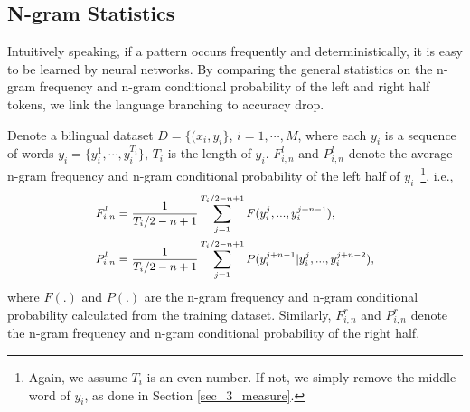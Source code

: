 \documentclass[11pt,a4paper]{article}
\begin{document}
\subsection{N-gram Statistics}
Intuitively speaking, if a pattern occurs frequently and deterministically, it is easy to be learned by neural networks. By comparing the general statistics on the n-gram frequency and n-gram conditional probability of the left and right half tokens, we link the language branching to accuracy drop.

Denote a bilingual dataset $D=\{(x_i,y_i\}$, $i=1,\cdots,M$, where each $y_i$ is a sequence of words $y_i=\{y_i^1,\cdots,y_i^{T_i}\}$, $T_i$ is the length of $y_i$. $F^{l}_{i,n}$ and $P^{l}_{i,n}$ denote the average n-gram frequency and n-gram conditional probability of the left half of $y_i$~\footnote{Again, we assume $T_i$ is an even number. If not, we simply remove the middle word of $y_i$, as done in Section \ref{sec_3_measure}.}, i.e.,
\begin{equation}
\small
\begin{aligned}
\label{eq_n_gram_freq}
F^{l}_{i,n}&=\frac{1}{T_i/2-n+1} \sum_{j=1}^{T_i/2-n+1} F(y_i^{j},...,y_i^{j+n-1}), \\
P^{l}_{i,n}&=\frac{1}{T_i/2-n+1} \sum_{j=1}^{T_i/2-n+1} P(y_i^{j+n-1} | y_i^{j},...,y_i^{j+n-2}),
\end{aligned}
\end{equation}
where $F(.)$ and $P(.)$ are the n-gram frequency and n-gram conditional probability calculated from the training dataset. Similarly, $F^{r}_{i,n}$ and $P^{r}_{i,n}$ denote the n-gram frequency and n-gram conditional probability of the right half.

\end{document}
